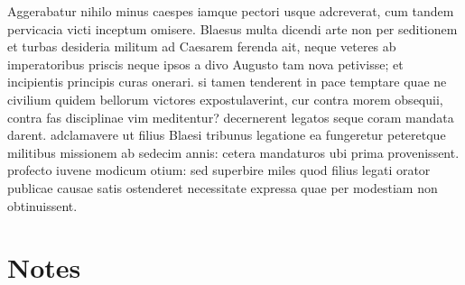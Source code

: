 \documentclass[10pt]{article}
\begin{document}
Aggerabatur nihilo minus caespes iamque pectori usque adcreverat, cum tandem pervicacia victi inceptum omisere. Blaesus multa dicendi arte non per seditionem et turbas desideria militum ad Caesarem ferenda ait, neque veteres ab imperatoribus priscis neque ipsos a divo Augusto tam nova petivisse; et  incipientis principis curas onerari. si tamen tenderent in pace temptare quae ne civilium quidem bellorum victores expostulaverint, cur contra morem obsequii, contra fas disciplinae vim meditentur? decernerent legatos seque coram mandata darent. adclamavere ut filius Blaesi tribunus legatione ea fungeretur peteretque militibus missionem ab sedecim annis: cetera mandaturos ubi prima provenissent. profecto iuvene modicum otium: sed superbire miles quod filius legati orator publicae causae satis ostenderet necessitate expressa quae per modestiam non obtinuissent.
  \pend
  \endnumbering

  \section{Notes}
\end{document}
